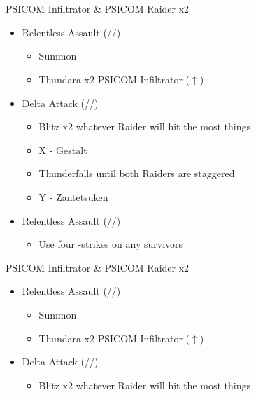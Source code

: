 \chapter[Chapter 9]{}
\newpage
\begin{paracol}{2}
	\renewcommand{\first}{[1] Relentless Assault (\rav/\rav/\com)}
	\renewcommand{\second}{[2] Delta Attack (\com/\rav/\sen)}
	\begin{battle}{PSICOM Infiltrator \& PSICOM Raider x2}
		\begin{itemize}
			\item \first
			      \begin{itemize}
				      \item Summon
				      \item Thundara x2 PSICOM Infiltrator ($\uparrow$)
			      \end{itemize}
			\item \second
			      \begin{itemize}
				      \item Blitz x2 whatever Raider will hit the most things
				      \item X - Gestalt
				      \item Thunderfalls until both Raiders are staggered
				      \item Y - Zantetsuken
			      \end{itemize}
			\item \first
			      \begin{itemize}
				      \item Use four -strikes on any survivors
			      \end{itemize}
		\end{itemize}
		  
	\end{battle}
	\switchcolumn
	\begin{battle}{PSICOM Infiltrator \& PSICOM Raider x2}
		\begin{itemize}
			\item \first
			      \begin{itemize}
				      \item Summon
				      \item Thundara x2 PSICOM Infiltrator ($\uparrow$)
			      \end{itemize}
			\item \second
			      \begin{itemize}
				      \item Blitz x2 whatever Raider will hit the most things

\end{itemize}
\end{itemize}
\end{battle}
\end{paracol}
